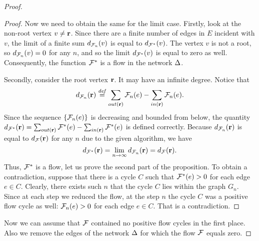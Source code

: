\documentclass[12pt,oneside,a4paper]{amsart}
\begin{document}
\begin{proof}
\begin{proof}
          Now we need to obtain the same for the limit case.
          Firstly, look at the non-root vertex $v \neq \mathbf{r}$.
          Since there are a finite number of edges in $E$ incident with $v$, the limit of
            a finite sum $d_{\mathcal{F}_{n}}(v)$ is equal to $d_{\mathcal{F^{*}}}(v)$.
          The vertex $v$ is not a root, so $d_{\mathcal{F}_{n}}(v) = 0$ for any $n$, and so the limit $d_{\mathcal{F^{*}}}(v)$ is equal to zero as well.
          Consequently, the function $\mathcal{F^{*}}$ is a flow in the network $\Delta$.

          Secondly, consider the root vertex $\mathbf{r}$.
          It may have an infinite degree.
          Notice that
          \[
            d_{\mathcal{F}_{n}}(\mathbf{r}) \overset{\mathit{def}}{=} \sum_{out(\mathbf{r})} \mathcal{F}_{n}(e) - \sum_{in(\mathbf{r})} \mathcal{F}_{n}(e).
          \]
          Since the sequence $\{\mathcal{F}_{n}(e)\}$ is decreasing and bounded from below,
            the quantity $d_{\mathcal{F^{*}}}(\mathbf{r})=\sum_{out(\mathbf{r})} \mathcal{F^{*}}(e) - \sum_{in(\mathbf{r})} \mathcal{F^{*}}(e)$ is defined correctly.
          Because $d_{\mathcal{F}_{n}}(\mathbf{r})$ is equal to $d_{\mathcal{F}}(\mathbf{r})$ for any $n$ due to the given algorithm, we have
          \[
            d_{\mathcal{F^{*}}}(\mathbf{r}) = \lim_{n \to \infty} d_{\mathcal{F}_{n}}(\mathbf{r}) = d_{\mathcal{F}}(\mathbf{r}).
          \]
          Thus, $\mathcal{F^{*}}$ is a flow, let us prove the second part of the proposition.
          To obtain a contradiction, suppose that there is a cycle $C$ such that $\mathcal{F^{*}}(e) > 0$ for
            each edge $e \in C$.
          Clearly, there exists such $n$ that the cycle $C$ lies within the graph $G_n$.
          Since at each step we reduced the flow, at the step $n$
            the cycle $C$ was a positive flow cycle as well: $\mathcal{F}_{n}(e) > 0$ for each edge $e \in C$.
          That is a contradiction.
        \end{proof}

        Now we can assume that $\mathcal{F}$ contained no positive flow cycles in the first place.
        Also we remove the edges of the network $\Delta$ for which the flow $\mathcal{F}$ equals zero.

      \medskip

\end{proof}
\end{document}
